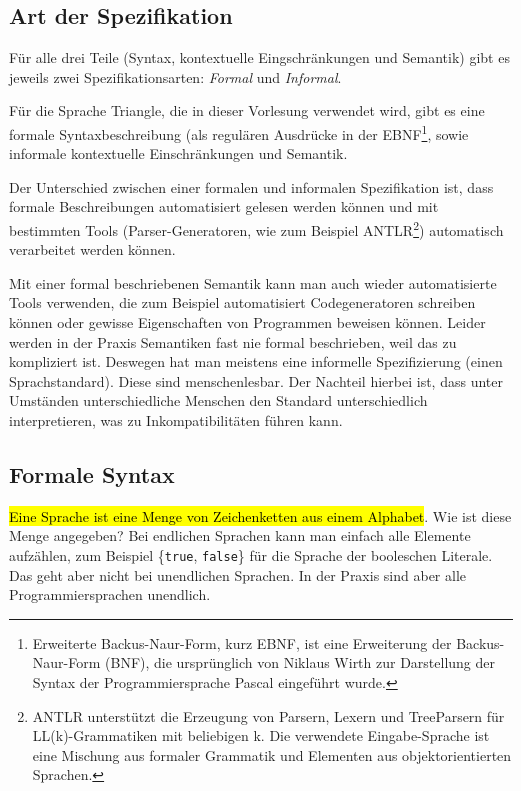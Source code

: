 \documentclass[
  ngerman,
  DIV=12
]{scrartcl}
\begin{document}
\subsection{Art der Spezifikation}

Für alle drei Teile (Syntax, kontextuelle Eingschränkungen und Semantik) gibt es jeweils zwei Spezifikationsarten: \emph{Formal} und \emph{Informal}.

Für die Sprache Triangle, die in dieser Vorlesung verwendet wird, gibt es eine formale Syntaxbeschreibung (als regulären Ausdrücke in der EBNF\footnote{Erweiterte Backus-Naur-Form, kurz EBNF, ist eine Erweiterung der Backus-Naur-Form (BNF), die ursprünglich von Niklaus Wirth zur Darstellung der Syntax der Programmiersprache Pascal eingeführt wurde.}, sowie informale kontextuelle Einschränkungen und Semantik.

Der Unterschied zwischen einer formalen und informalen Spezifikation ist, dass formale Beschreibungen automatisiert gelesen werden können und mit bestimmten Tools (Parser-Generatoren, wie zum Beispiel ANTLR\footnote{ANTLR unterstützt die Erzeugung von Parsern, Lexern und TreeParsern für LL(k)-Grammatiken mit beliebigen k. Die verwendete Eingabe-Sprache ist eine Mischung aus formaler Grammatik und Elementen aus objektorientierten Sprachen.}) automatisch verarbeitet werden können. 

Mit einer formal beschriebenen Semantik kann man auch wieder automatisierte Tools verwenden, die zum Beispiel automatisiert Codegeneratoren schreiben können oder gewisse Eigenschaften von Programmen beweisen können. Leider werden in der Praxis Semantiken fast nie formal beschrieben, weil das zu kompliziert ist. Deswegen hat man meistens eine informelle Spezifizierung (einen Sprachstandard). Diese sind menschenlesbar. Der Nachteil hierbei ist, dass unter Umständen unterschiedliche Menschen den Standard unterschiedlich interpretieren, was zu Inkompatibilitäten führen kann. 

\subsection{Formale Syntax}

\hl{Eine Sprache ist eine Menge von Zeichenketten aus einem Alphabet}. Wie ist diese Menge angegeben? Bei endlichen Sprachen kann man einfach alle Elemente aufzählen, zum Beispiel \{\verb|true|, \verb|false|\} für die Sprache der booleschen Literale. Das geht aber nicht bei unendlichen Sprachen. In der Praxis sind aber alle Programmiersprachen unendlich.
\end{document}
